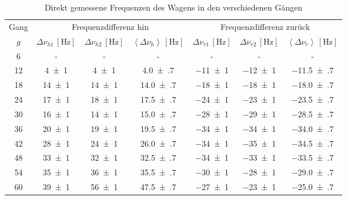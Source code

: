 \begin{table}[!h]
	\centering
	\begin{tabular}{|c|c|c|c|c|c|c|}
		\hline
 		Gang & \multicolumn{3}{c|}{Frequenzdifferenz hin} & \multicolumn{3}{c|}{Frequenzdifferenz zurück} \\
		$g$ & $\Delta\nu_{h1}\,[\si{\hertz}]$ & $\Delta\nu_{h2}\,[\si{\hertz}]$ & $\left<\Delta\nu_{h}\right>\,[\si{\hertz}]$ & $\Delta\nu_{r1}\,[\si{\hertz}]$ & $\Delta\nu_{r2}\,[\si{\hertz}]$ & $\left<\Delta\nu_{r}\right>\,[\si{\hertz}]$\\\hline\hline
		\num{6}  & -  & -  & -  & -  & -  & - \\
		\num{12}  & \num{4(1)}  & \num{4(1)}  & \num{4.0(7)}  & \num{-11(1)}  & \num{-12(1)}  & \num{-11.5(7)} \\
		\num{18}  & \num{14(1)}  & \num{14(1)}  & \num{14.0(7)}  & \num{-18(1)}  & \num{-18(1)}  & \num{-18.0(7)} \\
		\num{24}  & \num{17(1)}  & \num{18(1)}  & \num{17.5(7)}  & \num{-24(1)}  & \num{-23(1)}  & \num{-23.5(7)} \\
		\num{30}  & \num{16(1)}  & \num{14(1)}  & \num{15.0(7)}  & \num{-28(1)}  & \num{-29(1)}  & \num{-28.5(7)} \\
		\num{36}  & \num{20(1)}  & \num{19(1)}  & \num{19.5(7)}  & \num{-34(1)}  & \num{-34(1)}  & \num{-34.0(7)} \\
		\num{42}  & \num{28(1)}  & \num{24(1)}  & \num{26.0(7)}  & \num{-34(1)}  & \num{-35(1)}  & \num{-34.5(7)} \\
		\num{48}  & \num{33(1)}  & \num{32(1)}  & \num{32.5(7)}  & \num{-34(1)}  & \num{-33(1)}  & \num{-33.5(7)} \\
		\num{54}  & \num{35(1)}  & \num{36(1)}  & \num{35.5(7)}  & \num{-30(1)}  & \num{-28(1)}  & \num{-29.0(7)} \\
		\num{60}  & \num{39(1)}  & \num{56(1)}  & \num{47.5(7)}  & \num{-27(1)}  & \num{-23(1)}  & \num{-25.0(7)} \\
		\hline
	\end{tabular}
	\caption{Direkt gemessene Frequenzen des Wagens in den verschiedenen Gängen \label{tab:Auswertung_Frequenz_Schwebung}}
\end{table}